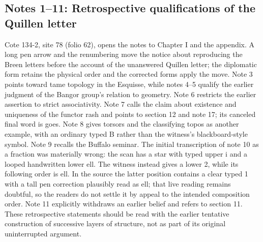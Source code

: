 \documentclass[10pt,oneside]{book}
\begin{document}
\subsection*{Notes 1--11: Retrospective qualifications of the Quillen letter}
Cote 134-2, site 78 (folio 62), opens the notes to Chapter I and the appendix. A long pen arrow and the renumbering move the notice about reproducing the Breen letters before the account of the unanswered Quillen letter; the diplomatic form retains the physical order and the corrected forms apply the move. Note 3 points toward tame topology in the Esquisse, while notes 4--5 qualify the earlier judgment of the Bangor group's relation to geometry. Note 6 restricts the earlier assertion to strict associativity. Note 7 calls the claim about existence and uniqueness of the functor rash and points to section 12 and note 17; its canceled final word is goes. Note 8 gives torsors and the classifying topos as another example, with an ordinary typed B rather than the witness's blackboard-style symbol. Note 9 recalls the Buffalo seminar. The initial transcription of note 10 as a fraction was materially wrong: the scan has a star with typed upper i and a looped handwritten lower ell. The witness instead gives a lower 2, while its following order is ell. In the source the latter position contains a clear typed 1 with a tall pen correction plausibly read as ell; that live reading remains doubtful, so the readers do not settle it by appeal to the intended composition order. Note 11 explicitly withdraws an earlier belief and refers to section 11. These retrospective statements should be read with the earlier tentative construction of successive layers of structure, not as part of its original uninterrupted argument.
\end{document}
